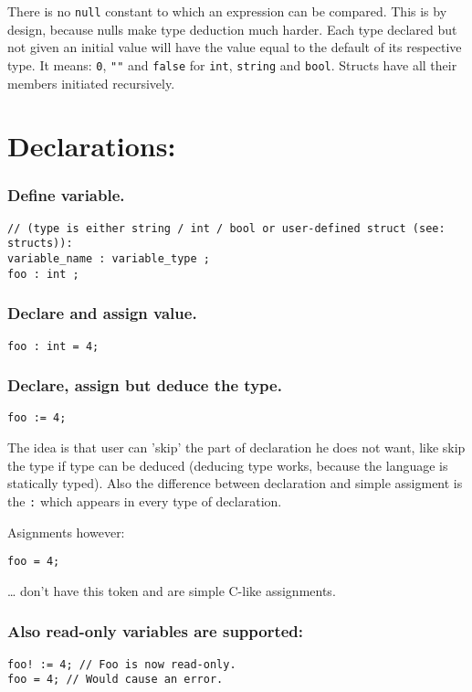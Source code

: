\documentclass[11pt]{article}
\begin{document}
There is no \texttt{null} constant to which an expression can be
compared. This is by design, because nulls make type deduction much
harder. Each type declared but not given an initial value will have the value
equal to the default of its respective type. It means: \texttt{0}, \texttt{""}
and \texttt{false} for \texttt{int}, \texttt{string} and
\texttt{bool}. Structs have all their members initiated recursively.

\section*{Declarations:}
\label{sec:org7e2d01b}

\subsubsection*{Define variable.}
\label{sec:orgc02987e}
\begin{verbatim}
// (type is either string / int / bool or user-defined struct (see: structs)):
variable_name : variable_type ;
foo : int ;
\end{verbatim}

\subsubsection*{Declare and assign value.}
\label{sec:org2d60f39}
\begin{verbatim}
foo : int = 4;
\end{verbatim}

\subsubsection*{Declare, assign but deduce the type.}
\label{sec:org0daccd4}
\begin{verbatim}
foo := 4;
\end{verbatim}

The idea is that user can 'skip' the part of declaration he does not want, like
skip the type if type can be deduced (deducing type works, because the language
is statically typed). Also the difference between declaration and simple
assigment is the \texttt{:} which appears in every type of declaration.

Asignments however:
\begin{verbatim}
foo = 4;
\end{verbatim}
\ldots{} don't have this token and are simple C-like assignments.

\subsubsection*{Also read-only variables are supported:}
\label{sec:org495fbac}
\begin{verbatim}
foo! := 4; // Foo is now read-only.
foo = 4; // Would cause an error.
\end{verbatim}
\end{document}
